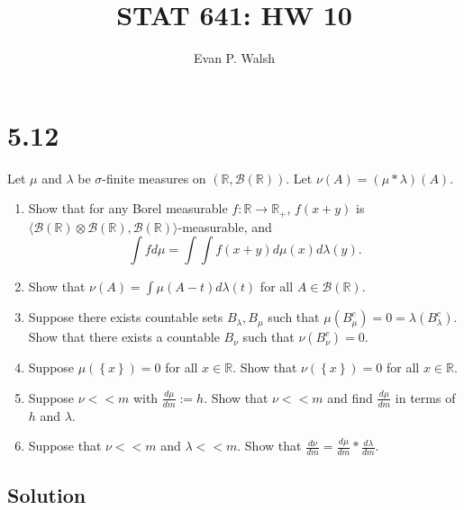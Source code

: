 \documentclass[12pt]{article}
\title{STAT 641: HW 10}
\author{Evan P. Walsh}
\begin{document}

\section*{5.12}
Let $\mu$ and $\lambda$ be $\sigma$-finite measures on $(\mathbb{R}, \mathcal{B}(\mathbb{R}))$. Let $\nu(A) = (\mu * \lambda)(A)$.
\begin{enumerate}[label=(\alph*)]
\item Show that for any Borel measurable $f : \mathbb{R} \rightarrow \mathbb{R}_{+}$, $f(x + y)$ is $\langle\mathcal{B}(\mathbb{R})\otimes
\mathcal{B}(\mathbb{R}), \mathcal{B}(\mathbb{R})\rangle$-measurable, and 
\[ \int fd\mu = \int \int f(x + y) d\mu(x) d\lambda(y). \]
\item Show that $\nu(A) = \int \mu(A - t)d\lambda(t)$ for all $A \in \mathcal{B}(\mathbb{R})$.
\item Suppose there exists countable sets $B_{\lambda}, B_{\mu}$ such that $\mu(B_{\mu}^{c}) = 0 = \lambda(B_{\lambda}^{c})$. Show that there exists a
countable $B_{\nu}$ such that $\nu(B_{\nu}^{c}) = 0$.
\item Suppose $\mu\left( \left\{ x \right\} \right) = 0$ for all $x \in \mathbb{R}$. Show that $\nu\left( \left\{ x \right\} \right) = 0$ for all $x
\in \mathbb{R}$.
\item Suppose $\nu << m$ with $\frac{d\mu}{dm} := h$. Show that $\nu << m$ and find $\frac{d\mu}{dm}$ in terms of $h$ and $\lambda$.
\item Suppose that $\nu << m$ and $\lambda << m$. Show that $\frac{d\nu}{dm} = \frac{d\mu}{dm}*\frac{d\lambda}{dm}$. 
\end{enumerate}

\subsection*{Solution}
\end{document}
